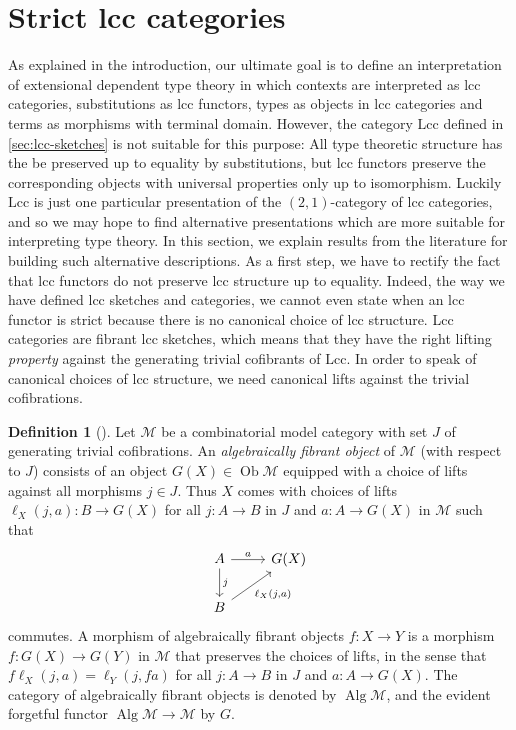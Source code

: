 \documentclass{article}
\theoremstyle{remark}
\theoremstyle{definition}
\newtheorem{definition}{Definition}
\begin{document}
\section{Strict lcc categories}
\label{sec:strict-lcc-categories}

As explained in the introduction, our ultimate goal is to define an interpretation of extensional dependent type theory in which contexts are interpreted as lcc categories, substitutions as lcc functors, types as objects in lcc categories and terms as morphisms with terminal domain.
However, the category $\mathrm{Lcc}$ defined in \ref{sec:lcc-sketches} is not suitable for this purpose:
All type theoretic structure has the be preserved up to equality by substitutions, but lcc functors preserve the corresponding objects with universal properties only up to isomorphism.
Luckily $\mathrm{Lcc}$ is just one particular presentation of the $(2, 1)$-category of lcc categories, and so we may hope to find alternative presentations which are more suitable for interpreting type theory.
In this section, we explain results from the literature for building such alternative descriptions.
As a first step, we have to rectify the fact that lcc functors do not preserve lcc structure up to equality.
Indeed, the way we have defined lcc sketches and categories, we cannot even state when an lcc functor is strict because there is no canonical choice of lcc structure.
Lcc categories are fibrant lcc sketches, which means that they have the right lifting \emph{property} against the generating trivial cofibrants of $\mathrm{Lcc}$.
In order to speak of canonical choices of lcc structure, we need canonical lifts against the trivial cofibrations.

\begin{definition}[\cite{algebraic-models}]
  Let $\mathcal{M}$ be a combinatorial model category with set $J$ of generating trivial cofibrations.
  An \emph{algebraically fibrant object} of $\mathcal{M}$ (with respect to $J$) consists of an object $G(X) \in \operatorname{Ob} \mathcal{M}$ equipped with a choice of lifts against all morphisms $j \in J$.
  Thus $X$ comes with choices of lifts $\ell_X({j, a}) : B \rightarrow G(X)$ for all $j : A \rightarrow B$ in $J$ and $a : A \rightarrow G(X)$ in $\mathcal{M}$ such that
  \begin{equation}
    \begin{tikzcd}
      A \arrow[d, "j"] \arrow[r, "a"] & G(X) \\
      B \arrow[ur, "{\ell_X(j, a)}"']
    \end{tikzcd}
  \end{equation}
  commutes.
  A morphism of algebraically fibrant objects $f : X \rightarrow Y$ is a morphism $f : G(X) \rightarrow G(Y)$ in $\mathcal{M}$ that preserves the choices of lifts, in the sense that $f \ell_X(j, a) = \ell_Y(j, fa)$ for all $j : A \rightarrow B$ in $J$ and $a : A \rightarrow G(X)$.
  The category of algebraically fibrant objects is denoted by $\operatorname{Alg} \mathcal{M}$, and the evident forgetful functor $\operatorname{Alg} \mathcal{M} \rightarrow \mathcal{M}$ by $G$.
\end{definition}
\end{document}
